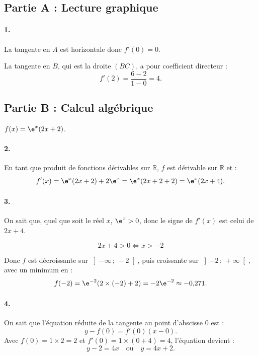 \subsection*{Partie A : Lecture graphique}

\paragraph{1.} La tangente en \(A\) est horizontale donc \(f'(0) = 0\).

La tangente en \(B\), qui est la droite \((BC)\), a pour coefficient directeur :
\[
f'(2) = \dfrac{6 - 2}{1 - 0} = 4.
\]

\subsection*{Partie B : Calcul algébrique}

\(f(x) = \e^x (2x + 2)\).

\paragraph{2.} En tant que produit de fonctions dérivables sur \(\mathbb{R}\), \(f\) est dérivable sur \(\mathbb{R}\) et :
\[
f'(x) = \e^x (2x + 2) + 2\e^x = \e^x(2x + 2 + 2) = \e^x(2x + 4).
\]

\paragraph{3.} On sait que, quel que soit le réel \(x\), \(\e^x > 0\), donc le signe de \(f'(x)\) est celui de \(2x + 4\).

\[
2x + 4 > 0 \iff x > -2
\]

Donc \(f\) est décroissante sur \(\left]-\infty\,;\,-2\right[\), puis croissante sur \(\left]-2\,;\,+\infty\right[\), avec un minimum en :
\[
f(-2) = \e^{-2}(2 \times (-2) + 2) = -2 \e^{-2} \approx -0{,}271.
\]

\begin{center}
\end{center}

\paragraph{4.} On sait que l'équation réduite de la tangente au point d'abscisse \(0\) est :
\[
y - f(0) = f'(0)(x - 0).
\]
Avec \(f(0) = 1 \times 2 = 2\) et \(f'(0) = 1 \times (0 + 4) = 4\), l'équation devient :
\[
y - 2 = 4x \quad \text{ou} \quad y = 4x + 2.
\]

